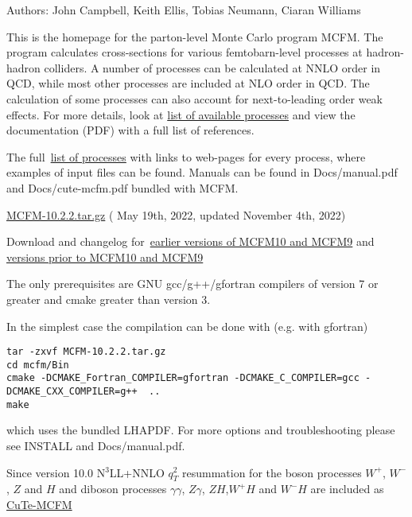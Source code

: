 
Authors: John Campbell, Keith Ellis, Tobias Neumann, Ciaran Williams

This is the homepage for the parton-level Monte Carlo program
MCFM. The program calculates cross-sections for various
femtobarn-level processes at hadron-hadron colliders. A number of
processes can be calculated at NNLO order in QCD, while most other
processes are included at NLO order in QCD. The calculation of some
processes can also account for next-to-leading order weak effects. For
more details, look at \href{\mcfmprocs/proclist.html}{list of available processes}
and view the documentation (PDF) with a full list of references. 

The full~\href{\mcfmprocs/proclist.html}{list of processes} with links to web-pages
for every process, where examples of input files can be found.
Manuals can be found in Docs/manual.pdf and Docs/cute-mcfm.pdf bundled with MCFM.

\href{https://mcfm.fnal.gov/downloads/MCFM-10.2.2.tar.gz}{MCFM-10.2.2.tar.gz} ( May 19th, 2022, updated November 4th, 2022)

Download and changelog for~\href{https://mcfm.fnal.gov/downloads/earlier_versions.html}{earlier versions of MCFM10 and MCFM9}
and \href{https://mcfm.fnal.gov/downloads/much_earlier_versions.html}{versions prior to MCFM10 and MCFM9}

The only prerequisites are GNU gcc/g++/gfortran compilers of version 7 or greater and cmake greater than version 3.

In the simplest case the compilation can be done with (e.g. with gfortran)
\begin{verbatim}
tar -zxvf MCFM-10.2.2.tar.gz
cd mcfm/Bin 
cmake -DCMAKE_Fortran_COMPILER=gfortran -DCMAKE_C_COMPILER=gcc -DCMAKE_CXX_COMPILER=g++  ..
make
\end{verbatim}
which uses the bundled LHAPDF. For more options and troubleshooting please see INSTALL and Docs/manual.pdf.


Since version 10.0 N$^3$LL+NNLO $q_T^2$ resummation for the boson processes $W^+$, $W^-$, $Z$ and $H$ and 
diboson processes $\gamma \gamma$, $Z\gamma$, $ZH$,$W^+H$ and $W^-H$ are included as \href{https://mcfm.fnal.gov/downloads/cute-mcfm.html}{CuTe-MCFM}

